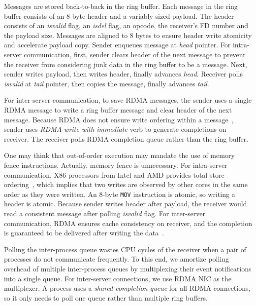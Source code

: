 Messages are stored back-to-back in the ring buffer. Each message in the ring buffer consists of an 8-byte header and a variably sized payload. The header consists of an \textit{isvalid} flag, an \textit{isdel} flag, an opcode, the receiver's FD number and the payload size. Messages are aligned to 8 bytes to ensure header write atomicity and accelerate payload copy. Sender enqueues message at \textit{head} pointer. For intra-server communication, first, sender clears header of the next message to prevent the receiver from considering junk data in the ring buffer to be a message. Next, sender writes payload, then writes header, finally advances \textit{head}. Receiver polls \textit{isvalid} at \textit{tail} pointer, then copies the message, finally advances \textit{tail}.

For inter-server communication, to save RDMA messages, the sender uses a single RDMA message to write a ring buffer message and clear header of the next message. Because RDMA does not ensure write ordering within a message~\cite{infiniband2000infiniband}, sender uses \textit{RDMA write with immediate} verb to generate completions on receiver. The receiver polls RDMA completion queue rather than the ring buffer.

One may think that out-of-order execution may mandate the use of memory fence instructions. Actually, memory fence is unnecessary. For intra-server communication, X86 processors from Intel and AMD provides total store ordering~\cite{sewell2010x86,intel-manual}, which implies that two writes are observed by other cores in the same order as they were written. An 8-byte \texttt{MOV} instruction is atomic, so writing a header is atomic. Because sender writes header after payload, the receiver would read a consistent message after polling \textit{isvalid} flag. For inter-server communication, RDMA ensures cache consistency on receiver, and the completion is guaranteed to be delivered after writing the data~\cite{infiniband2000infiniband}.

Polling the inter-process queue wastes CPU cycles of the receiver when a pair of processes do not communicate frequently. To this end, we amortize polling overhead of multiple inter-process queues by multiplexing their event notifications into a single queue.
For inter-server connections, we use RDMA NIC as the multiplexer. A process uses a \textit{shared completion queue} for all RDMA connections, so it only needs to poll one queue rather than multiple ring buffers.


